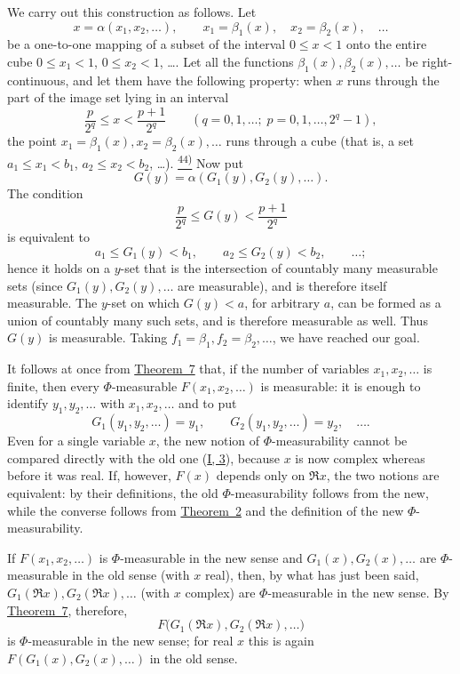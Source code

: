 \documentclass[12pt,b5paper,twoside]{article}
\newcommand{\noteref}[1]{%
  \hyperlink{note:#1}{\textsuperscript{#1)}}}
\begin{document}
We carry out this construction as follows.  Let
\[
 x=\alpha(x_1,x_2,\ldots),
 \qquad x_1=\beta_1(x),\quad x_2=\beta_2(x),\quad\ldots
\]
be a one-to-one mapping of a subset of the interval $0\leq x<1$ onto the entire cube
$0\leq x_1<1$, $0\leq x_2<1$, \ldots.  Let all the functions
$\beta_1(x),\beta_2(x),\ldots$ be right-continuous, and let them have the
following property: when $x$ runs through the part of the image set lying in an
interval
\[
 \frac{p}{2^q}\leq x<\frac{p+1}{2^q}
 \qquad(q=0,1,\ldots;\;p=0,1,\ldots,2^q-1),
\]
the point $x_1=\beta_1(x),x_2=\beta_2(x),\ldots$ runs through
a cube (that is, a set $a_1\leq x_1<b_1$, $a_2\leq x_2<b_2$, \ldots).\noteref{44}
Now put
\[
 G(y)=\alpha(G_1(y),G_2(y),\ldots).
\]
The condition
\[
 \frac{p}{2^q}\leq G(y)<\frac{p+1}{2^q}
\]
is equivalent to
\[
 a_1\leq G_1(y)<b_1,\qquad a_2\leq G_2(y)<b_2,\qquad\ldots;
\]
hence it holds on a $y$-set that is the intersection of countably many measurable
sets (since $G_1(y),G_2(y),\ldots$ are measurable), and is therefore itself
measurable.  The $y$-set on which $G(y)<a$, for arbitrary $a$, can be formed as a
union of countably many such sets, and is therefore measurable as well.  Thus $G(y)$
is measurable.  Taking $f_1=\beta_1,f_2=\beta_2,\ldots$, we have reached our goal.

It follows at once from \hyperref[thm:7]{Theorem~7} that, if the number of variables
$x_1,x_2,\ldots$ is finite, then every $\Phi$-measurable
$F(x_1,x_2,\ldots)$ is measurable: it is enough to identify
$y_1,y_2,\ldots$ with $x_1,x_2,\ldots$ and to put
\[
 G_1(y_1,y_2,\ldots)=y_1,\qquad
 G_2(y_1,y_2,\ldots)=y_2,\quad\ldots.
\]
Even for a single variable $x$, the new notion of $\Phi$-measurability cannot be
compared directly with the old one (\hyperref[sec:I.3]{I, 3}), because $x$ is now
complex whereas before it was real.  If, however, $F(x)$ depends only on $\Re x$, the
two notions are equivalent: by their definitions, the old $\Phi$-measurability
follows from the new, while the converse follows from \hyperref[thm:2]{Theorem~2} and
the definition of the new $\Phi$-measurability.

If $F(x_1,x_2,\ldots)$ is $\Phi$-measurable in the new sense and
$G_1(x),G_2(x),\ldots$ are $\Phi$-measurable in the old sense (with $x$ real), then,
by what has just been said, $G_1(\Re x),G_2(\Re x),\ldots$ (with $x$ complex) are
$\Phi$-measurable in the new sense.  By \hyperref[thm:7]{Theorem~7}, therefore,
\[
 F\bigl(G_1(\Re x),G_2(\Re x),\ldots\bigr)
\]
is $\Phi$-measurable in the new sense; for real $x$ this is again
$F(G_1(x),G_2(x),\ldots)$ in the old sense.
\end{document}
